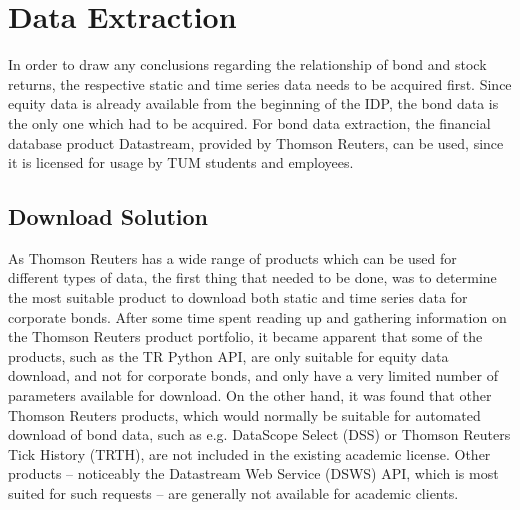 \chapter{Data Extraction} \label{chapter:data-extraction}
In order to draw any conclusions regarding the relationship of bond and stock returns, the respective static and time series data needs to be acquired first. Since equity data is already available from the beginning of the IDP, the bond data is the only one which had to be acquired. For bond data extraction, the financial database product Datastream, provided by Thomson Reuters, can be used, since it is licensed for usage by TUM students and employees. 

\section{Download Solution} \label{section:download-solution}
As Thomson Reuters has a wide range of products which can be used for different types of data, the first thing that needed to be done, was to determine the most suitable product to download both static and time series data for corporate bonds. After some time spent reading up and gathering information on the Thomson Reuters product portfolio, it became apparent that some of the products, such as the TR Python API, are only suitable for equity data download, and not for corporate bonds, and only have a very limited number of parameters available for download. On the other hand, it was found that other Thomson Reuters products, which would normally be suitable for automated download of bond data, such as e.g. DataScope Select (DSS) or Thomson Reuters Tick History (TRTH), are not included in the existing academic license. Other products -- noticeably the Datastream Web Service (DSWS) API, which is most suited for such requests -- are generally not available for academic clients. 

